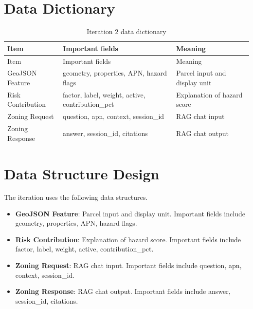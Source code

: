 \documentclass[12pt,a4paper,oneside]{report}
\begin{document}
\section{Data Dictionary}

\begin{longtable}{p{}p{}p{}}
\caption{Iteration 2 data dictionary}\label{tab:iter7dict}\\
\toprule
Item & Important fields & Meaning \\
\midrule
\endfirsthead
\toprule
Item & Important fields & Meaning \\
\midrule
\endhead

GeoJSON Feature & geometry, properties, APN, hazard flags & Parcel input and display unit \\

Risk Contribution & factor, label, weight, active, contribution\_pct & Explanation of hazard score \\

Zoning Request & question, apn, context, session\_id & RAG chat input \\

Zoning Response & answer, session\_id, citations & RAG chat output \\

\bottomrule
\end{longtable}

\section{Data Structure Design}
The iteration uses the following data structures.
\begin{itemize}

\item \textbf{GeoJSON Feature}: Parcel input and display unit. Important fields include geometry, properties, APN, hazard flags.

\item \textbf{Risk Contribution}: Explanation of hazard score. Important fields include factor, label, weight, active, contribution\_pct.

\item \textbf{Zoning Request}: RAG chat input. Important fields include question, apn, context, session\_id.

\item \textbf{Zoning Response}: RAG chat output. Important fields include answer, session\_id, citations.

\end{itemize}
\end{document}
